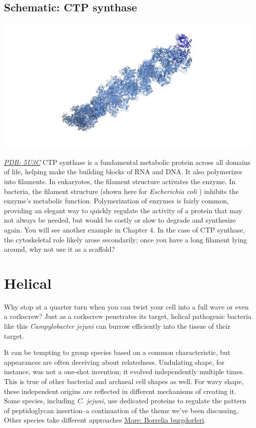 \documentclass[]{tufte-book}
\begin{document}
\hypertarget{CTP_synthase}{\subsection*{Schematic: CTP
synthase}\label{CTP_synthase}}

\includegraphics{img/schematics/3_4_1}

\href{http://rcsb.org/structure/5U3C}{\emph{PDB: 5U3C}} CTP synthase is
a fundamental metabolic protein across all domains of life, helping make
the building blocks of RNA and DNA. It also polymerizes into filaments.
In eukaryotes, the filament structure activates the enzyme. In bacteria,
the filament structure (shown here for \emph{Escherichia coli}
\citep{lynch2017}) inhibits the enzyme's metabolic function.
Polymerization of enzymes is fairly common, providing an elegant way to
quickly regulate the activity of a protein that may not always be
needed, but would be costly or slow to degrade and synthesize again. You
will see another example in Chapter 4. In the case of CTP synthase, the
cytoskeletal role likely arose secondarily; once you have a long
filament lying around, why not use it as a scaffold?

\section{Helical}\label{helical}

Why stop at a quarter turn when you can twist your cell into a full wave
or even a corkscrew? Just as a corkscrew penetrates its target, helical
pathogenic bacteria like this \emph{Campylobacter jejuni} can burrow
efficiently into the tissue of their target.

It can be tempting to group species based on a common characteristic,
but appearances are often deceiving about relatedness. Undulating shape,
for instance, was not a one-shot invention; it evolved independently
multiple times. This is true of other bacterial and archaeal cell shapes
as well. For wavy shape, these independent origins are reflected in
different mechanisms of creating it. Some species, including \emph{C.
jejuni}, use dedicated proteins to regulate the pattern of peptidoglycan
insertion--a continuation of the theme we've been discussing. Other
species take different approaches
\protect\hyperlink{Borrelia_burgdorferi}{More: Borrelia burgdorferi}.
\end{document}
